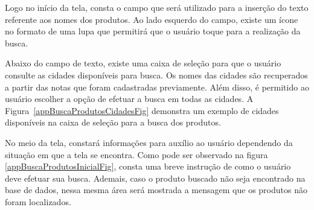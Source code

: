 Logo no início da tela, consta o campo que será utilizado para a inserção do texto referente aos nomes dos produtos. Ao lado esquerdo do campo, existe um ícone no formato de uma lupa que permitirá que o usuário toque para a realização da busca.

Abaixo do campo de texto, existe uma caixa de seleção para que o usuário consulte as cidades disponíveis para busca. Os nomes das cidades são recuperados a partir das notas que foram cadastradas previamente. Além disso, é permitido ao usuário escolher a opção de efetuar a busca em todas as cidades. A Figura~\ref{appBuscaProdutosCidadesFig} demonstra um exemplo de cidades disponíveis na caixa de seleção para a busca dos produtos.

No meio da tela, constará informações para auxílio ao usuário dependendo da situação em que a tela se encontra. Como pode ser observado na figura \ref{appBuscaProdutosInicialFig}, consta uma breve instrução de como o usuário deve efetuar sua busca. Ademais, caso o produto buscado não seja encontrado na base de dados, nessa mesma área será mostrada a mensagem que os produtos não foram localizados.

